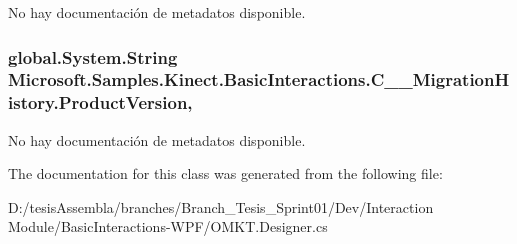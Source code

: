 No hay documentación de metadatos disponible. 

\hypertarget{class_microsoft_1_1_samples_1_1_kinect_1_1_basic_interactions_1_1_c_____migration_history_a6703139c33da8e0a252dd8be924b8b47}{
\subsubsection[{Product\-Version}]{\setlength{\rightskip}{0pt plus 5cm}global.\-System.\-String Microsoft.\-Samples.\-Kinect.\-Basic\-Interactions.\-C\-\_\-\-\_\-\-Migration\-History.\-Product\-Version\hspace{0.3cm}{\ttfamily [get]}, {\ttfamily [set]}}}\label{class_microsoft_1_1_samples_1_1_kinect_1_1_basic_interactions_1_1_c_____migration_history_a6703139c33da8e0a252dd8be924b8b47}


No hay documentación de metadatos disponible. 



The documentation for this class was generated from the following file\-:\begin{DoxyCompactItemize}
\item 
D\-:/tesis\-Assembla/branches/\-Branch\-\_\-\-Tesis\-\_\-\-Sprint01/\-Dev/\-Interaction Module/\-Basic\-Interactions-\/\-W\-P\-F/O\-M\-K\-T.\-Designer.\-cs\end{DoxyCompactItemize}
